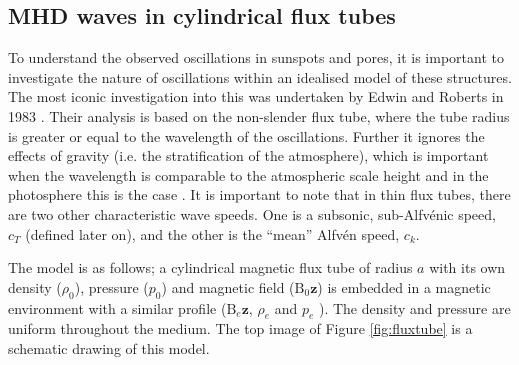 \subsection{MHD waves in cylindrical flux tubes}

    To understand the observed oscillations in sunspots and pores, it is important to investigate the nature of oscillations within an idealised model of these structures.
    The most iconic investigation into this was undertaken by Edwin and Roberts in 1983 \citep{WPMC}.
    Their analysis is based on the non-slender flux tube, where the tube radius is greater or equal to the wavelength of the oscillations.
    Further it ignores the effects of gravity (i.e. the stratification of the atmosphere), which is important when the wavelength is comparable to the atmospheric scale height and in the photosphere this is the case \citep{LNLMHD}. 
    It is important to note that in thin flux tubes, there are two other characteristic wave speeds.
    One is a subsonic, sub-Alfv\'{e}nic speed, $c_T$ (defined later on), and the other is the ``mean'' Alfv\'{e}n speed, $c_k$.

    The model is as follows; a cylindrical magnetic flux tube of radius $a$ with its own density ($\rho_0$), pressure ($p_0$) and magnetic field ($\mathrm{B}_0\textbf{\^{z}}$) is embedded in a magnetic environment with a similar profile ($\mathrm{B}_e \textbf{\^{z}}$, $\rho_e$ and $p_e$ ).   
    The density and pressure are uniform throughout the medium.
    The top image of Figure \ref{fig:fluxtube} is a schematic drawing of this model. 
        
